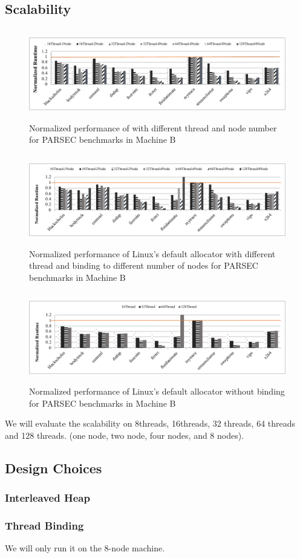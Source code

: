 \subsection{Scalability}
\label{sec:scale}
\begin{figure}[H]
    \centering
    \includegraphics[width=\textwidth,height=150]{paper/figure/scalobility-numalloc.pdf}
    \caption{Normalized performance of \NM{} with different thread and node number for PARSEC benchmarks in Machine B}
    \label{numalloc-scalibity}
\end{figure}
\begin{figure}[H]
    \centering
    \includegraphics[width=\textwidth,height=150]{paper/figure/scalobility-binding-pthread.pdf}
    \caption{Normalized performance of Linux's default allocator with different thread and binding to different number of nodes for PARSEC benchmarks in Machine B}
    \label{binding-pthread-scalibity}
\end{figure}
\begin{figure}[H]
    \centering
    \includegraphics[width=\textwidth,height=150]{paper/figure/scalobility-pthread.pdf}
    \caption{Normalized performance of Linux's default allocator without binding for PARSEC benchmarks in Machine B}
    \label{pthread-scalibity}
\end{figure}
We will evaluate the scalability on 8threads, 16threads, 32 threads, 64 threads and 128 threads. 
(one node, two node, four nodes, and 8 nodes). 

\subsection{Design Choices}
\label{sec:design}

\subsubsection{Interleaved Heap} 

\subsubsection{Thread Binding}
\label{sec: threadbinding}
We will only run it on the 8-node machine. 

